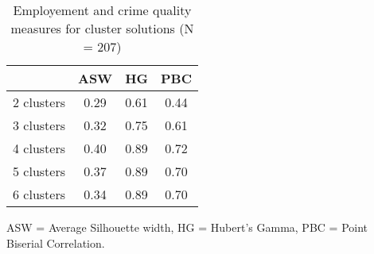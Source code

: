 \begin{table}[htp]
\footnotesize
\setlength{\tabcolsep}{35pt}
\renewcommand{\arraystretch}{1.3}
\begin{threeparttable}
\centering
\caption{Employement and crime quality measures for cluster solutions (N = 207)} 
\label{tab:quality_clusters_job_crime}
\begin{tabular}{lccc}
  \hline
 & ASW & HG & PBC \\ 
  \hline
2 clusters & 0.29 & 0.61 & 0.44 \\ 
  3 clusters & 0.32 & 0.75 & 0.61 \\ 
  4 clusters & 0.40 & 0.89 & 0.72 \\ 
  5 clusters & 0.37 & 0.89 & 0.70 \\ 
  6 clusters & 0.34 & 0.89 & 0.70 \\ 
   \hline
\end{tabular}
\begin{tablenotes}
\scriptsize
\item ASW = Average Silhouette width, HG = Hubert's Gamma, PBC = Point Biserial Correlation.
\end{tablenotes}
\end{threeparttable}
\end{table}
